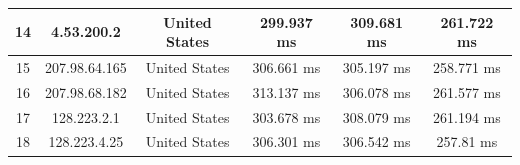 \begin{table}[]
\begin{tabular}{ | c | c | c | c | c | c | }
14	& 4.53.200.2      &     	   United States  &   	     299.937 ms    &  	     309.681 ms   &   	     261.722 ms   \\ \hline    
15	& 207.98.64.165     &   	   United States  &   	     306.661 ms    &  	     305.197 ms   &   	     258.771 ms   \\ \hline    
16	& 207.98.68.182     &   	   United States  &   	     313.137 ms    &  	     306.078 ms   &   	     261.577 ms   \\ \hline    
17	& 128.223.2.1       &   	   United States  &   	     303.678 ms    &  	     308.079 ms   &   	     261.194 ms   \\ \hline    
18	& 128.223.4.25      &   	   United States  &   	     306.301 ms    &  	     306.542 ms   &   	      257.81 ms   \\ \hline    
\end{tabular}
\end{table}


